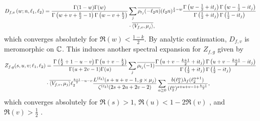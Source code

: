\documentclass[12pt,reqno,oneside]{amsart}
\begin{document}
  \begin{align*}
    D_{f,v}\left(w;n,\ell_{1},\ell_{2}\right) = \frac{\Gamma(1-w)\Gamma(w)}{\Gamma\left(w+v+\frac{k}{2}-1\right)\Gamma\left(w-v+\frac{k}{2}\right)}&\sum_{j}\overline{\rho_{t_{j}}(-\ell_{2}n)}(\ell_{2}n)^{\frac{1}{2}-w}\frac{\Gamma\left(w-\frac{1}{2}+it_{j}\right)\Gamma\left(w-\frac{1}{2}-it_{j}\right)}{\Gamma\left(\frac{1}{2}+it_{j}\right)\Gamma\left(\frac{1}{2}-it_{j}\right)} \\
    &\cdot \overline{\langle V_{f,v},\mu_{j}\rangle},
  \end{align*}
  which converges absolutely for $\Re(w) < \frac{1-k}{2}$. By analytic continuation, $D_{f,v}$ is meromorphic on $\mathbb{C}$. This induces another spectral expansion for $Z_{f,g}$ given by
  \begin{align*}
    Z_{f,g}(s,u,v;\ell_{1},\ell_{2}) &= \frac{\Gamma\left(\frac{k}{2}+1-u-v\right)\Gamma\left(u+v-\frac{k}{2}\right)}{\Gamma(u+2v-1)\Gamma(u)}\sum_{j}\overline{\rho_{t_{j}}(-1)}\frac{\Gamma\left(u+v-\frac{k+1}{2}+it_{j}\right)\Gamma\left(u+v-\frac{k+1}{2}-it_{j}\right)}{\Gamma\left(\frac{1}{2}+it_{j}\right)\Gamma\left(\frac{1}{2}-it_{j}\right)} \\
    &\cdot \overline{\langle V_{f,v},\mu_{j}\rangle}\ell_{2}^{\frac{k+1}{2}-u-v}\frac{L^{(\ell_{2})}(s+u+v-1,g \times \mu_{j})}{\zeta^{(\ell_{2})}(2s+2u+2v-2)}\sum_{\alpha \ge 0}\frac{b(\ell_{2}^{\alpha})\lambda_{f}(\ell_{2}^{\alpha+1})}{(\ell_{2}^{\alpha})^{s+u+v-1+\frac{k-1}{2}}},
  \end{align*}
  which converges absolutely for $\Re(s) > 1$, $\Re(u) < 1-2\Re(v)$ , and $\Re(v) > \frac{1}{2}$ .
\end{document}
